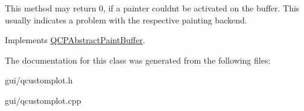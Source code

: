 This method may return 0, if a painter couldn\textquotesingle{}t be activated on the buffer. This usually indicates a problem with the respective painting backend. 

Implements \hyperlink{classQCPAbstractPaintBuffer_a9e9f29b19c033cf02fb96f1a148463f3}{Q\+C\+P\+Abstract\+Paint\+Buffer}.



The documentation for this class was generated from the following files\+:\begin{DoxyCompactItemize}
\item 
gui/qcustomplot.\+h\item 
gui/qcustomplot.\+cpp\end{DoxyCompactItemize}

